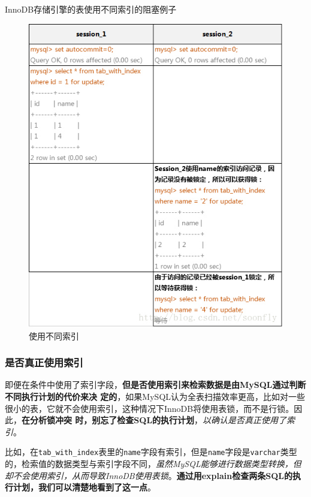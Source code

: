 \documentclass[UTF8,a4paper,12pt]{ctexbook}
\begin{document}
				InnoDB存储引擎的表使用不同索引的阻塞例子 
				\begin{figure}[H]
					\centering
					\includegraphics[width=13cm]{lock-row3}
					\caption{使用不同索引}
				\end{figure}				
			
			
			\subsubsection{是否真正使用索引}		
				即便在条件中使用了索引字段，\textbf{但是否使用索引来检索数据是由MySQL通过判断不同执行计划的代价来决 定的}，如果MySQL认为全表扫描效率更高，比如对一些很小的表，它就不会使用索引，这种情况下InnoDB将使用表锁，而不是行锁。因此，\textbf{在分析锁冲突 时，别忘了检查SQL的执行计划}，\textit{以确认是否真正使用了索引}。 
				
				比如，在\verb|tab_with_index|表里的\verb|name|字段有索引，但是\verb|name|字段是\verb|varchar|类型的，检索值的数据类型与索引字段不同，\textit{虽然MySQL能够进行数据类型转换，但却不会使用索引，从而导致InnoDB使用表锁}。\textbf{通过用explain检查两条SQL的执行计划，我们可以清楚地看到了这一点}。
				
\end{document}
